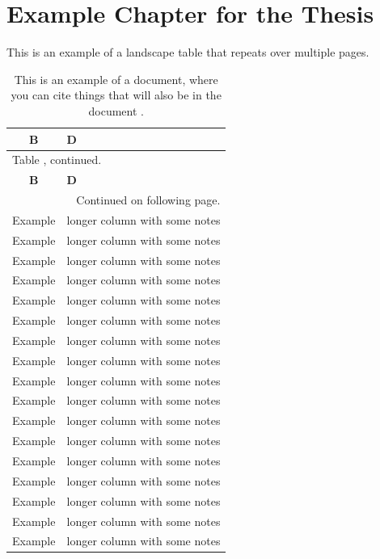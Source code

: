 \label{appendix:ch1}

\chapter{Example Chapter for the Thesis}

This is an example of a landscape table that repeats over multiple pages.

\begin{landscape}
	\begin{longtable}{c|p{12cm}}
		\caption{This is an example of a document, where you can cite things that will also be in the document \parencite{upham_inferring_2019}.} \\
		\label{tab:appendix_s1}
		\textbf{B} & \textbf{D} \\
		\midrule
		\endfirsthead
		\multicolumn{2}{l}{Table \thetable, continued.} \\
		\textbf{B} & \textbf{D} \\
		\midrule
		\endhead
		\midrule
		\multicolumn{2}{r}{Continued on following page.}
		\endfoot
		\endlastfoot
		Example & longer column with some notes \\
		Example & longer column with some notes \\
		Example & longer column with some notes \\
		Example & longer column with some notes \\
		Example & longer column with some notes \\
		Example & longer column with some notes \\
		Example & longer column with some notes \\
		Example & longer column with some notes \\
		Example & longer column with some notes \\
		Example & longer column with some notes \\
		Example & longer column with some notes \\
		Example & longer column with some notes \\
		Example & longer column with some notes \\
		Example & longer column with some notes \\
		Example & longer column with some notes \\
		Example & longer column with some notes \\
		Example & longer column with some notes \\
		Example & longer column with some notes \\

\end{longtable}
\end{landscape}
